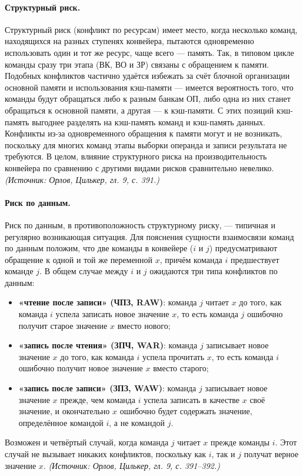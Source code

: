 \documentclass[a4paper,12pt]{article}
\begin{document}
\paragraph{Структурный риск.}
Структурный риск (конфликт по ресурсам) имеет место, когда несколько команд, находящихся на разных ступенях конвейера, пытаются одновременно использовать один и тот же ресурс, чаще всего --- память. Так, в типовом цикле команды сразу три этапа (ВК, ВО и ЗР) связаны с обращением к памяти. Подобных конфликтов частично удаётся избежать за счёт блочной организации основной памяти и использования кэш-памяти --- имеется вероятность того, что команды будут обращаться либо к разным банкам ОП, либо одна из них станет обращаться к основной памяти, а другая --- к кэш-памяти. С этих позиций кэш-память выгоднее разделять на кэш-память команд и кэш-память данных. Конфликты из-за одновременного обращения к памяти могут и не возникать, поскольку для многих команд этапы выборки операнда и записи результата не требуются. В целом, влияние структурного риска на производительность конвейера по сравнению с другими видами рисков сравнительно невелико.
\textit{(Источник: Орлов, Цилькер, гл. 9, с. 391.)}

\paragraph{Риск по данным.}
Риск по данным, в противоположность структурному риску, --- типичная и регулярно возникающая ситуация. Для пояснения сущности взаимосвязи команд по данным положим, что две команды в конвейере (\(i\) и \(j\)) предусматривают обращение к одной и той же переменной \(x\), причём команда \(i\) предшествует команде \(j\). В общем случае между \(i\) и \(j\) ожидаются три типа конфликтов по данным:
\begin{itemize}
\item \textbf{«чтение после записи» (ЧПЗ, RAW)}: команда \(j\) читает \(x\) до того, как команда \(i\) успела записать новое значение \(x\), то есть команда \(j\) ошибочно получит старое значение \(x\) вместо нового;
\item \textbf{«запись после чтения» (ЗПЧ, WAR)}: команда \(j\) записывает новое значение \(x\) до того, как команда \(i\) успела прочитать \(x\), то есть команда \(i\) ошибочно получит новое значение \(x\) вместо старого;
\item \textbf{«запись после записи» (ЗПЗ, WAW)}: команда \(j\) записывает новое значение \(x\) прежде, чем команда \(i\) успела записать в качестве \(x\) своё значение, и окончательно \(x\) ошибочно будет содержать значение, определённое командой \(i\), а не командой \(j\).
\end{itemize}
Возможен и четвёртый случай, когда команда \(j\) читает \(x\) прежде команды \(i\). Этот случай не вызывает никаких конфликтов, поскольку как \(i\), так и \(j\) получат верное значение \(x\).
\textit{(Источник: Орлов, Цилькер, гл. 9, с. 391--392.)}
\end{document}
